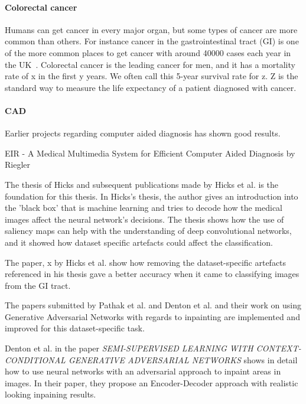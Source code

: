 \paragraph{Colorectal cancer}
Humans can get cancer in every major organ, but some types of cancer are more common than others.    
For instance cancer in the gastrointestinal tract (GI) is one of the more common places to get cancer with around 40000 cases each year in the UK~\cite{UKCancerBowel}. Colorectal cancer is the leading cancer for men, and it has a mortality rate of x in the first y years. %
We often call this 5-year survival rate for z. Z is the standard way to measure the life expectancy of a patient diagnosed with cancer. 

\paragraph{CAD}
Earlier projects regarding computer aided diagnosis has shown good results.



EIR - A Medical Multimedia System for Efficient
Computer Aided Diagnosis by Riegler 

The thesis of Hicks and subsequent publications made by Hicks et al. is the foundation for this thesis. In Hicks's thesis, the author gives an introduction into the 'black box' that is machine learning and tries to decode how the medical images affect the neural network's decisions. 
The thesis shows how the use of saliency maps can help with the understanding of deep convolutional networks, and it showed how dataset specific artefacts could affect the classification.


\iffalse
The paper, x by Hicks et al. show how removing the dataset-specific artefacts referenced in his thesis gave a better accuracy when it came to classifying images from the GI tract.


The papers submitted by Pathak et al. and Denton et al. and their work on using Generative Adversarial Networks with regards to inpainting are implemented and improved for this dataset-specific task.

Denton et al. in the paper \textit{SEMI-SUPERVISED LEARNING WITH
CONTEXT-CONDITIONAL GENERATIVE
ADVERSARIAL NETWORKS} shows in detail how to use neural networks with an adversarial approach to inpaint areas in images. In their paper, they propose an Encoder-Decoder approach with realistic looking inpaining results.


